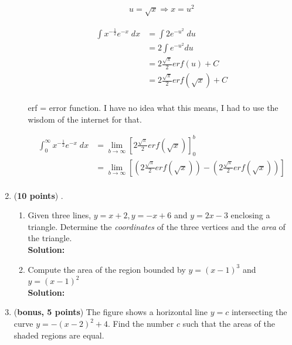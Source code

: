 \documentclass[a4paper]{article}
\begin{document}
\begin{enumerate}
\begin{enumerate}
\begin{align*}
	u = \sqrt{x} \Rightarrow x = u^2
\end{align*}

\begin{align*}
\int x^{-\frac{1}{2}} e^{-x} \; dx &= \int 2e^{-u^2}\; du\\
&= 2 \int e^{-u^2}du\\
&= 2 \frac{\sqrt{\pi}}{2}erf(u) + C\\
&= 2 \frac{\sqrt{\pi}}{2}erf(\sqrt{x}) + C\\
\end{align*}

erf = error function. I have no idea what this means, I had to use the wisdom of the internet for that.


\begin{align*}
\int_0^\infty x^{-\frac{1}{2}}e^{-x} \; dx &= \lim_{b \to \infty}\left[ 2 \frac{\sqrt{\pi}}{2} erf(\sqrt{x})\right]_0^b\\
&= \lim_{b \to \infty}\left[ (2 \frac{\sqrt{\pi}}{2}erf(\sqrt{x}))-(2 \frac{\sqrt{\pi}}{2}erf(\sqrt{x})) \right]\\
\end{align*}



\end{enumerate}


\item (\textbf{10 points}) .


\begin{enumerate}
	\item Given three lines, $y = x + 2, y = -x + 6$ and $y = 2x - 3$ enclosing a triangle. Determine the \textit{coordinates} of the three vertices and the \textit{area} of the triangle.\\
	\textbf{Solution:}\\


	\item Compute the area of the region bounded by $y = (x - 1)^3$ and $y = (x - 1)^2$\\
	\textbf{Solution:}\\
\end{enumerate}

\newpage

\item (\textbf{bonus, 5 points}) The figure shows a horizontal line $y = c$ intersecting the curve $y = -(x - 2)^2 + 4$. Find the number $c$ such that the areas of the shaded regions are equal.



\end{enumerate}
\end{document}
